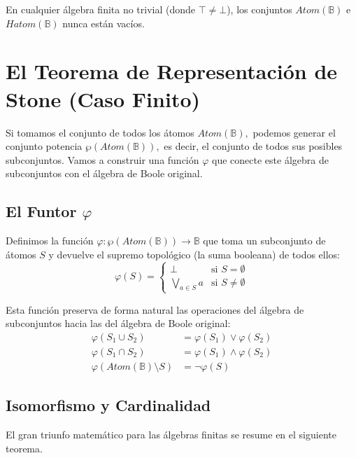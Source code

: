 En cualquier álgebra finita no trivial (donde $\top \ne \bot$), los conjuntos $\mathit{Atom}(\mathbb{B})$ e $\mathit{Hatom}(\mathbb{B})$ nunca están vacíos.

\section{El Teorema de Representación de Stone (Caso Finito)}

Si tomamos el conjunto de todos los átomos $\mathit{Atom}(\mathbb{B}),$ podemos generar el conjunto potencia $\wp(\mathit{Atom}(\mathbb{B})),$ es decir, el conjunto de todos sus posibles subconjuntos. Vamos a construir una función $\varphi$ que conecte este álgebra de subconjuntos con el álgebra de Boole original.

\subsection{El Funtor $\varphi$}
Definimos la función $\varphi : \wp(\mathit{Atom}(\mathbb{B})) \to \mathbb{B}$ que toma un subconjunto de átomos $S$ y devuelve el supremo topológico (la suma booleana) de todos ellos:
\[
\varphi(S) = \begin{cases}
\bot & \text{si } S = \emptyset \\
\bigvee_{a \in S} a & \text{si } S \ne \emptyset
\end{cases}
\]

Esta función preserva de forma natural las operaciones del álgebra de subconjuntos hacia las del álgebra de Boole original:
\begin{align*}
\varphi(S_1 \cup S_2) &= \varphi(S_1) \vee \varphi(S_2) \\
\varphi(S_1 \cap S_2) &= \varphi(S_1) \wedge \varphi(S_2) \\
\varphi(\mathit{Atom}(\mathbb{B}) \setminus S) &= \neg \varphi(S)
\end{align*}

\subsection{Isomorfismo y Cardinalidad}
El gran triunfo matemático para las álgebras finitas se resume en el siguiente teorema.

